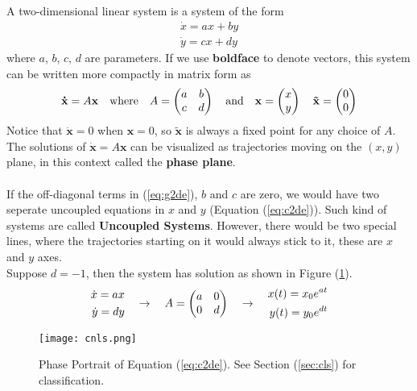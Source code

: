 A two-dimensional linear system is a system of the form
\begin{equation}
	\begin{aligned}
		\dot{x}=ax+by\\
		\dot{y}=cx+dy
	\end{aligned}
\end{equation}
where $a$, $b$, $c$, $d$ are parameters.
If we use \textbf{boldface} to denote vectors, this system can be written more compactly in matrix form as
\begin{equation}{\label{eq:g2de}}
	\mathbf{\dot{x}}=A\mathbf{x} \quad \text{where} \quad 
	A=
	\begin{pmatrix}
		a&b\\c&d
	\end{pmatrix}\quad\text{and}\quad
	\mathbf{x}=
	\begin{pmatrix}
		x\\y
	\end{pmatrix}\quad
	\mathbf{\tilde{x}}=
	\begin{pmatrix}
		0\\0
	\end{pmatrix}
\end{equation} 
Notice that $\mathbf{\dot{x}}=0$ when $\mathbf{x}=0$, so $\mathbf{\tilde{x}}$ is always a fixed point for any choice of $A$.
The solutions of $\mathbf{\dot{x}}=A\mathbf{x}$ can be visualized as trajectories moving on the $(x,y)$ plane, in this context called the {\textbf{phase plane}}.\\\\
If the off-diagonal terms in (\ref{eq:g2de}), $b$ and $c$ are zero, we would have two seperate uncoupled equations in $x$ and $y$ (Equation (\ref{eq:c2de})).
Such kind of systems are called \textbf{Uncoupled Systems}.
However, there would be two special lines, where the trajectories starting on it would always stick to it, these are  $x$ and $y$ axes\label{txt:xya}.\\
Suppose $d=-1$, then the system has solution as shown in Figure (\ref{fig:cnls}).
\begin{equation}{\label{eq:c2de}}
	\begin{aligned}
		\dot{x}=ax\\
		\dot{y}=dy
	\end{aligned}\quad\rightarrow\quad
	\begin{aligned}
		A=\begin{pmatrix}
		a&0\\0&d
		\end{pmatrix}
	\end{aligned}\quad\rightarrow\quad
	\begin{aligned} 
		x(t)=x_0e^{at}\\
		y(t)=y_0e^{dt}
	\end{aligned}
\end{equation}
\begin{figure}[h!]
	\centering
	\texttt{[image: cnls.png]}
	\caption{Phase Portrait of Equation (\ref{eq:c2de}). See Section (\ref{sec:cls}) for classification.}
	\label{fig:cnls}
\end{figure}
